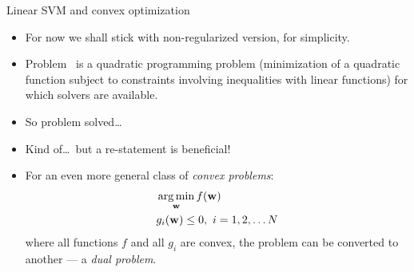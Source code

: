 \documentclass[handout]{beamer}   %
\def\argmin{\mathop{\rm arg\,min}\limits}
\def\b#1{{\bf #1}}
\begin{document}
\begin{frame}{Linear SVM and convex optimization}
  \begin{itemize}
  \item For now we shall stick with non-regularized version, for simplicity.

    \pause
  \item Problem \svmprimary\ is a quadratic programming problem
    (minimization of a quadratic function subject to constraints involving
    inequalities with linear functions) for which solvers are available.

    \pause
  \item So problem solved\dots

    \pause
  \item Kind of\dots\ but a re-statement is beneficial!  %

    \pause
  \item For an even more general class of {\it convex problems\/}:
    \begin{align}
      \label{eq:conv:pri:opt}
      {}& \argmin_{\b w}f(\b w) \\
      \label{eq:conv:pri:constr}
      {}& g_i(\b w) \le 0, \ i=1,2,\ldots N
    \end{align}
    where all functions $f$ and all $g_i$ are convex, the problem can be converted to 
    another --- a {\it dual problem}. 
  \end{itemize}
\end{frame}
\def\convprimary{(\ref{eq:conv:pri:opt}-\ref{eq:conv:pri:constr})}
\end{document}
